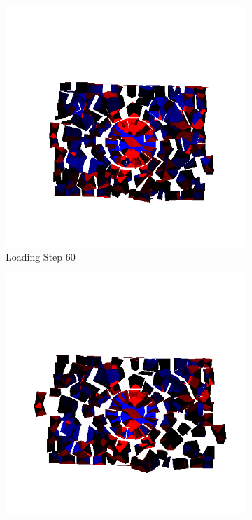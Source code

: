 \begin{figure}[ht!]
    \begin{subfigure}{.33\textwidth}
      \centering
      \includegraphics[width=1.0\linewidth]{Files/Small_DEF/Free_IS2/DEP5-STEP(080).png}
      \caption{Loading Step 60}
    \end{subfigure}%
    \begin{subfigure}{.33\textwidth}
      \centering
      \includegraphics[width=1.0\linewidth]{Files/Small_DEF/Free_IS2/DEP5-STEP(100).png}

\end{subfigure}
\end{figure}
